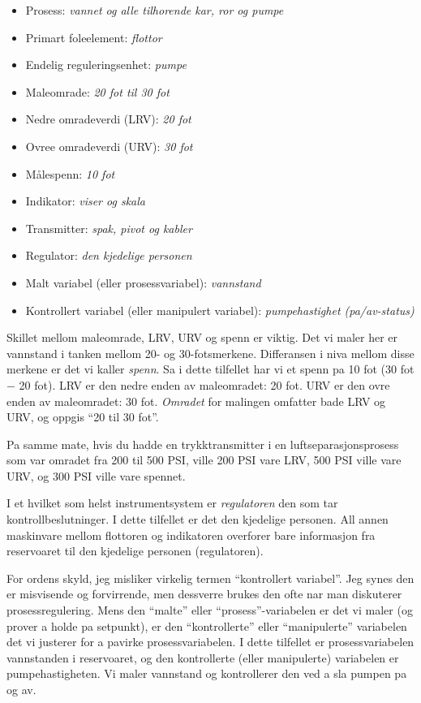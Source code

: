 \begin{itemize}
\item{} Prosess: {\it vannet og alle tilhorende kar, ror og pumpe}
\item{} Primart foleelement: {\it flottor}
\item{} Endelig reguleringsenhet: {\it pumpe}
\item{} Maleomrade: {\it 20 fot til 30 fot}
\item{} Nedre omradeverdi (LRV): {\it 20 fot}
\item{} Ovree omradeverdi (URV): {\it 30 fot}
\item{} Målespenn: {\it 10 fot}
\item{} Indikator: {\it viser og skala}
\item{} Transmitter: {\it spak, pivot og kabler}
\item{} Regulator: {\it den kjedelige personen}
\item{} Malt variabel (eller prosessvariabel): {\it vannstand}
\item{} Kontrollert variabel (eller manipulert variabel): {\it pumpehastighet (pa/av-status)}
\end{itemize}

Skillet mellom maleomrade, LRV, URV og spenn er viktig.  Det vi maler her er vannstand i tanken mellom 20- og 30-fotsmerkene.  Differansen i niva mellom disse merkene er det vi kaller {\it spenn}.  Sa i dette tilfellet har vi et spenn pa 10 fot (30 fot $-$ 20 fot).  LRV er den nedre enden av maleomradet: 20 fot.  URV er den ovre enden av maleomradet: 30 fot.  {\it Omradet} for malingen omfatter bade LRV og URV, og oppgis ``20 til 30 fot''.

Pa samme mate, hvis du hadde en trykktransmitter i en luftseparasjonsprosess som var omradet fra 200 til 500 PSI, ville 200 PSI vare LRV, 500 PSI ville vare URV, og 300 PSI ville vare spennet.

\vskip 10pt

I et hvilket som helst instrumentsystem er {\it regulatoren} den som tar kontrollbeslutninger.  I dette tilfellet er det den kjedelige personen.  All annen maskinvare mellom flottoren og indikatoren overforer bare informasjon fra reservoaret til den kjedelige personen (regulatoren).

\vskip 10pt

For ordens skyld, jeg misliker virkelig termen ``kontrollert variabel''.  Jeg synes den er misvisende og forvirrende, men dessverre brukes den ofte nar man diskuterer prosessregulering.  Mens den ``malte'' eller ``prosess''-variabelen er det vi maler (og prover a holde pa setpunkt), er den ``kontrollerte'' eller ``manipulerte'' variabelen det vi justerer for a pavirke prosessvariabelen.  I dette tilfellet er prosessvariabelen vannstanden i reservoaret, og den kontrollerte (eller manipulerte) variabelen er pumpehastigheten.  Vi maler vannstand og kontrollerer den ved a sla pumpen pa og av.

